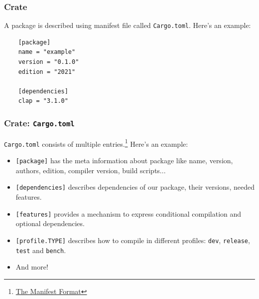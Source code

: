 \documentclass[aspectratio=1610,t]{beamer}
\begin{document}

\begin{frame}[fragile]
\frametitle{Crate}
A package is described using manifest file called \texttt{Cargo.toml}. Here's an example:

\begin{verbatim}
    [package]
    name = "example"
    version = "0.1.0"
    edition = "2021"

    [dependencies]
    clap = "3.1.0"
\end{verbatim}
\end{frame}


\begin{frame}[fragile]
\frametitle{Crate: \texttt{Cargo.toml}}
\texttt{Cargo.toml} consists of multiple entries.\footnote{\href{https://doc.rust-lang.org/cargo/reference/manifest.html#the-rust-version-field}{The Manifest Format}} Here's an example:

\begin{itemize}
    \item \texttt{[package]} has the meta information about package like name, version, authors, edition, compiler version, build scripts...
    \item \texttt{[dependencies]} describes dependencies of our package, their versions, needed features.
    \item \texttt{[features]} provides a mechanism to express conditional compilation and optional dependencies.
    \item \texttt{[profile.TYPE]} describes how to compile in different profiles: \texttt{dev}, \texttt{release}, \texttt{test} and \texttt{bench}.
    \item And more!
\end{itemize}
\end{frame}

\end{document}
